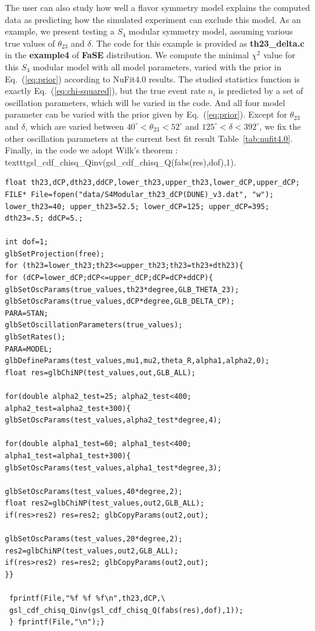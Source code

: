 \documentclass[aps,prd,nofootinbib,preprint]{revtex4}
\begin{document}
The user can also study how well a flavor symmetry model explains the computed data as predicting how the simulated experiment can exclude this model. As an example, we present testing {\color{blue}a $S_4$ modular symmetry model}, assuming various true values of $\theta_{23}$ and $\delta$. {\color{blue}The code for this example is provided as \textbf{th23\_delta.c} in the \textbf{example4} of \textbf{FaSE} distribution.} We compute the minimal $\chi^2$ value for {\color{blue}this $S_4$ modular model} with all model parameters, varied with the prior in Eq.~(\ref{eq:prior}) according to NuFit4.0 results. The studied statistics function is exactly Eq.~(\ref{eq:chi-squared}), but the true event rate $n_i$ is predicted by a set of oscillation parameters, which will be varied in the code. And all four model parameter can be varied with the prior given by Eq.~(\ref{eq:prior}). 
%
Except for $\theta_{23}$ and $\delta$, which are varied between $40^\circ<\theta_{23}<52^\circ$ and $125^\circ<\delta<392^\circ$, we fix the other oscillation parameters at the current best fit result Table~\ref{tab:nufit4.0}. Finally, in the code we adopt Wilk's theorem \cite{Wilks:1938dza}: texttt{gsl\_cdf\_chisq\_Qinv(gsl\_cdf\_chisq\_Q(fabs(res),dof),1)}.\vspace{0.2cm}\\
\begin{verbatim}
float th23,dCP,dth23,ddCP,lower_th23,upper_th23,lower_dCP,upper_dCP;
FILE* File=fopen("data/S4Modular_th23_dCP(DUNE)_v3.dat", "w");
lower_th23=40; upper_th23=52.5; lower_dCP=125; upper_dCP=395;
dth23=.5; ddCP=5.;

int dof=1;
glbSetProjection(free);
for (th23=lower_th23;th23<=upper_th23;th23=th23+dth23){
for (dCP=lower_dCP;dCP<=upper_dCP;dCP=dCP+ddCP){
glbSetOscParams(true_values,th23*degree,GLB_THETA_23);
glbSetOscParams(true_values,dCP*degree,GLB_DELTA_CP);
PARA=STAN;
glbSetOscillationParameters(true_values);
glbSetRates();
PARA=MODEL;
glbDefineParams(test_values,mu1,mu2,theta_R,alpha1,alpha2,0);
float res=glbChiNP(test_values,out,GLB_ALL);
        
for(double alpha2_test=25; alpha2_test<400; alpha2_test=alpha2_test+300){
glbSetOscParams(test_values,alpha2_test*degree,4);
        
for(double alpha1_test=60; alpha1_test<400; alpha1_test=alpha1_test+300){
glbSetOscParams(test_values,alpha1_test*degree,3);
            
glbSetOscParams(test_values,40*degree,2);
float res2=glbChiNP(test_values,out2,GLB_ALL);
if(res>res2) res=res2; glbCopyParams(out2,out);
           
glbSetOscParams(test_values,20*degree,2);
res2=glbChiNP(test_values,out2,GLB_ALL);
if(res>res2) res=res2; glbCopyParams(out2,out);
}}
  
 fprintf(File,"%f %f %f\n",th23,dCP,\
 gsl_cdf_chisq_Qinv(gsl_cdf_chisq_Q(fabs(res),dof),1));
 } fprintf(File,"\n");}
        \end{verbatim}
\end{document}
